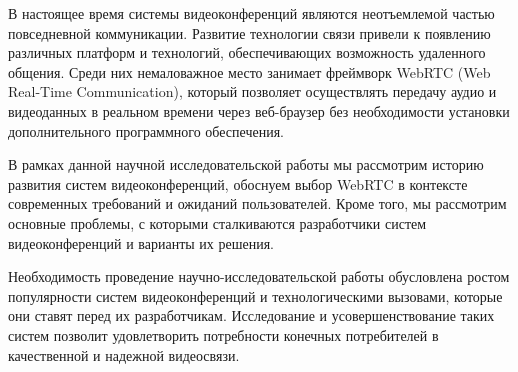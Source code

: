 
В настоящее время системы видеоконференций являются неотъемлемой частью повседневной коммуникации. Развитие технологии связи привели к появлению различных платформ и технологий, обеспечивающих возможность удаленного общения. Среди них немаловажное место занимает фреймворк WebRTC (Web Real-Time Communication), который позволяет осуществлять передачу аудио и видеоданных в реальном времени через веб-браузер без необходимости установки дополнительного программного обеспечения.

В рамках данной научной исследовательской работы мы рассмотрим историю развития систем видеоконференций, обоснуем выбор WebRTC в контексте современных требований и ожиданий пользователей. Кроме того, мы рассмотрим основные проблемы, с которыми сталкиваются разработчики систем видеоконференций и варианты их решения.

Необходимость проведение научно-исследовательской работы обусловлена ростом популярности систем видеоконференций и технологическими вызовами, которые они ставят перед их разработчикам. Исследование и усовершенствование таких систем позволит удовлетворить потребности конечных потребителей в качественной и надежной видеосвязи.

\pagebreak